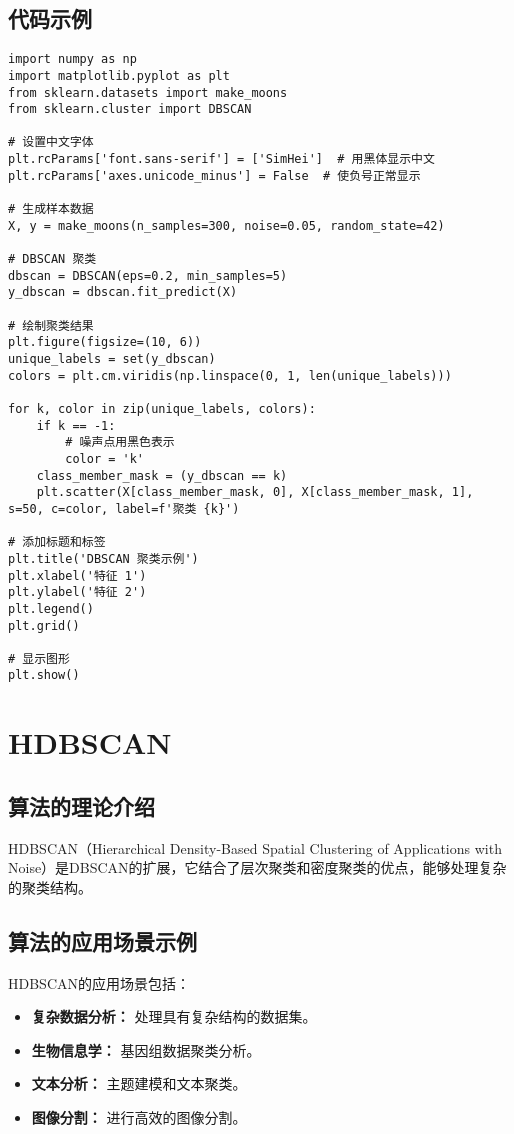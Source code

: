 \subsection*{代码示例}
\begin{lstlisting}
import numpy as np
import matplotlib.pyplot as plt
from sklearn.datasets import make_moons
from sklearn.cluster import DBSCAN

# 设置中文字体
plt.rcParams['font.sans-serif'] = ['SimHei']  # 用黑体显示中文
plt.rcParams['axes.unicode_minus'] = False  # 使负号正常显示

# 生成样本数据
X, y = make_moons(n_samples=300, noise=0.05, random_state=42)

# DBSCAN 聚类
dbscan = DBSCAN(eps=0.2, min_samples=5)
y_dbscan = dbscan.fit_predict(X)

# 绘制聚类结果
plt.figure(figsize=(10, 6))
unique_labels = set(y_dbscan)
colors = plt.cm.viridis(np.linspace(0, 1, len(unique_labels)))

for k, color in zip(unique_labels, colors):
    if k == -1:
        # 噪声点用黑色表示
        color = 'k'
    class_member_mask = (y_dbscan == k)
    plt.scatter(X[class_member_mask, 0], X[class_member_mask, 1], s=50, c=color, label=f'聚类 {k}')

# 添加标题和标签
plt.title('DBSCAN 聚类示例')
plt.xlabel('特征 1')
plt.ylabel('特征 2')
plt.legend()
plt.grid()

# 显示图形
plt.show()

\end{lstlisting}


\section{HDBSCAN}
\subsection*{算法的理论介绍}
HDBSCAN（Hierarchical Density-Based Spatial Clustering of Applications with Noise）是DBSCAN的扩展，它结合了层次聚类和密度聚类的优点，能够处理复杂的聚类结构。

\subsection*{算法的应用场景示例}
HDBSCAN的应用场景包括：
\begin{itemize}
    \item \textbf{复杂数据分析：} 处理具有复杂结构的数据集。
    \item \textbf{生物信息学：} 基因组数据聚类分析。
    \item \textbf{文本分析：} 主题建模和文本聚类。
    \item \textbf{图像分割：} 进行高效的图像分割。
\end{itemize}

